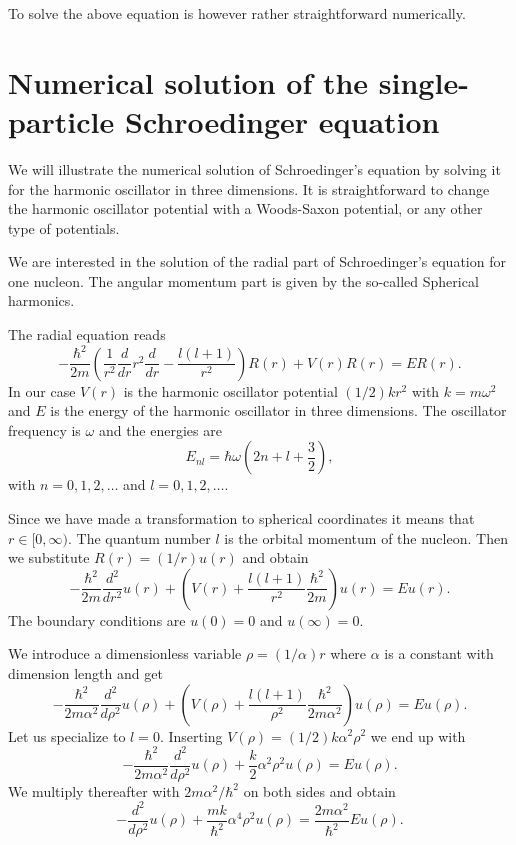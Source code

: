 \documentclass[%
oneside,                 %
final,                   %
10pt]{article}
\begin{document}
To solve the above equation is however rather straightforward numerically. 



\section*{Numerical solution of the single-particle Schroedinger equation}

We will illustrate the numerical solution of Schroedinger's equation by solving it for the harmonic oscillator in three dimensions.
It is straightforward to change the harmonic oscillator potential with a Woods-Saxon potential, or any other type of potentials. 

We are interested in the solution of the radial part of Schroedinger's equation for one nucleon. 
The angular momentum part  is given by the so-called Spherical harmonics. 

The radial equation reads
\[
  -\frac{\hbar^2}{2 m} \left ( \frac{1}{r^2} \frac{d}{dr} r^2
  \frac{d}{dr} - \frac{l (l + 1)}{r^2} \right )R(r) 
     + V(r) R(r) = E R(r).
\]
In our case $V(r)$ is the harmonic oscillator potential $(1/2)kr^2$ with
$k=m\omega^2$ and $E$ is
the energy of the harmonic oscillator in three dimensions.
The oscillator frequency is $\omega$ and the energies are
\[
E_{nl}=  \hbar \omega \left(2n+l+\frac{3}{2}\right),
\]
with $n=0,1,2,\dots$ and $l=0,1,2,\dots$.



Since we have made a transformation to spherical coordinates it means that 
$r\in [0,\infty)$.  
The quantum number
$l$ is the orbital momentum of the nucleon.   Then we substitute $R(r) = (1/r) u(r)$ and obtain
\[
  -\frac{\hbar^2}{2 m} \frac{d^2}{dr^2} u(r) 
       + \left ( V(r) + \frac{l (l + 1)}{r^2}\frac{\hbar^2}{2 m}
                                    \right ) u(r)  = E u(r) .
\]
The boundary conditions are $u(0)=0$ and $u(\infty)=0$.




We introduce a dimensionless variable $\rho = (1/\alpha) r$
where $\alpha$ is a constant with dimension length and get
\[
  -\frac{\hbar^2}{2 m \alpha^2} \frac{d^2}{d\rho^2} u(\rho) 
       + \left ( V(\rho) + \frac{l (l + 1)}{\rho^2}
         \frac{\hbar^2}{2 m\alpha^2} \right ) u(\rho)  = E u(\rho) .
\]
Let us specialize to $l=0$. 
Inserting $V(\rho) = (1/2) k \alpha^2\rho^2$ we end up with
\[
  -\frac{\hbar^2}{2 m \alpha^2} \frac{d^2}{d\rho^2} u(\rho) 
       + \frac{k}{2} \alpha^2\rho^2u(\rho)  = E u(\rho) .
\]
We multiply thereafter with $2m\alpha^2/\hbar^2$ on both sides and obtain
\[
  -\frac{d^2}{d\rho^2} u(\rho) 
       + \frac{mk}{\hbar^2} \alpha^4\rho^2u(\rho)  = \frac{2m\alpha^2}{\hbar^2}E u(\rho) .
\]
\end{document}
